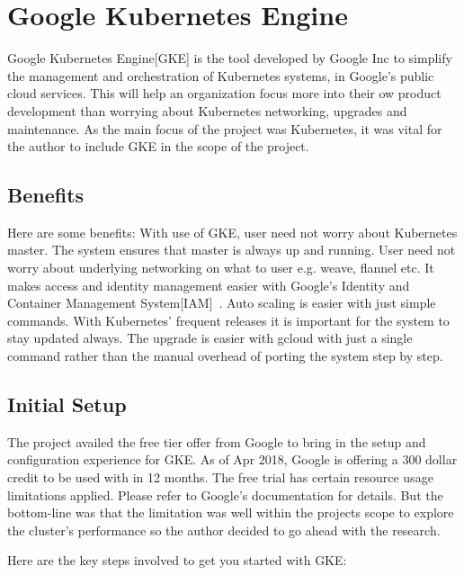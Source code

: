 \section{ Google Kubernetes Engine}

Google Kubernetes Engine[GKE] is the tool developed by Google Inc to simplify
the management and orchestration of Kubernetes systems, in Google's public
cloud services. This will help an organization focus more into their ow
product development than worrying about Kubernetes networking, upgrades and
maintenance. As the main focus of the project was Kubernetes, it was vital for
the author to include GKE in the scope of the project.

\subsection{Benefits}

Here are some benefits: With use of GKE, user need not worry about Kubernetes
master. The system ensures that master is always up and running. User need not
worry about underlying networking on what to user e.g. weave, flannel etc.  It
makes access and identity management easier with Google's Identity and
Container Management System[IAM]~\cite{hid-sp18-417-IAM}. Auto scaling is
easier with just simple commands. With Kubernetes' frequent releases it is
important for the system to stay updated always. The upgrade is easier with
gcloud with just a single command rather than the manual overhead of porting
the system step by step.

\subsection{Initial Setup}

The project availed the free tier offer from Google to bring in the setup and
configuration experience for GKE. As of Apr 2018, Google is offering a 300
dollar credit to be used with in 12 months. The free trial has certain
resource usage limitations applied. Please refer to Google's documentation for
details. But the bottom-line was that the limitation was well within the
projects scope to explore the cluster's performance so the author decided to
go ahead with the research.

Here are the key steps involved to get you started with GKE:

